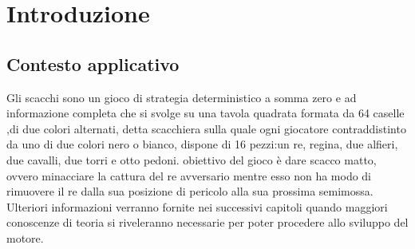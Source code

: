 \chapter{Introduzione}

\section{Contesto applicativo} %
Gli scacchi sono un gioco di strategia deterministico a somma zero e ad informazione completa  
che si svolge su una tavola quadrata formata da 64 caselle ,di due colori alternati,
detta scacchiera sulla quale ogni giocatore contraddistinto da uno di due colori
nero o bianco, dispone di 16 pezzi:un re, regina, due alfieri, due cavalli, due torri e otto pedoni.
obiettivo del gioco è dare scacco matto, ovvero minacciare la cattura del re avversario mentre esso non
ha modo di rimuovere il re dalla sua posizione di pericolo alla sua prossima semimossa.
Ulteriori informazioni verranno fornite nei successivi capitoli quando maggiori conoscenze di teoria 
si riveleranno necessarie per poter procedere allo sviluppo del motore.


